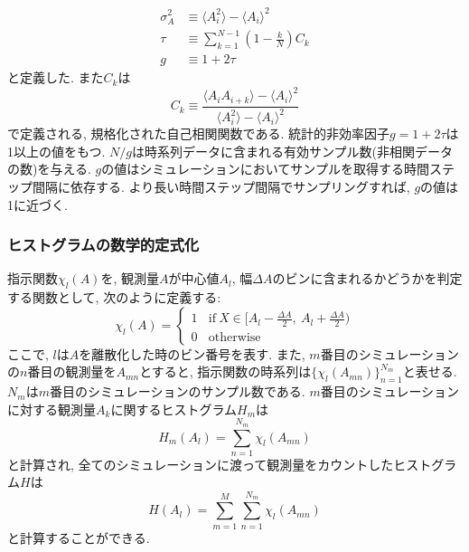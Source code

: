 \begin{align}
    \sigma_{A}^{2} &\equiv \langle A_{i}^{2} \rangle - \langle A_{i} \rangle^{2}
    \\
    \tau           &\equiv \sum_{k=1}^{N-1}\left(1 - \frac{k}{N}\right)C_{k}
    \\
    g              &\equiv 1 + 2\tau
\end{align}
と定義した. また$C_{k}$は
\begin{equation}
    C_{k} \equiv
    \frac{\langle A_{i} A_{i+k}\rangle - \langle A_{i} \rangle^{2}}{\langle A_{i}^{2} \rangle - \langle A_{i} \rangle^{2}}
\end{equation}
で定義される, 規格化された自己相関関数である. 
統計的非効率因子$g=1+2\tau$は1以上の値をもつ. $N/g$は時系列データに含まれる有効サンプル数(非相関データの数)を与える. 
$g$の値はシミュレーションにおいてサンプルを取得する時間ステップ間隔に依存する. 
より長い時間ステップ間隔でサンプリングすれば, $g$の値は1に近づく. 

\subsubsection{ヒストグラムの数学的定式化}
指示関数$\chi_{l}(A)$を, 観測量$A$が中心値$A_{l}$, 幅$\Delta A$のビンに含まれるかどうかを判定する関数として, 次のように定義する:
\begin{equation}
    \chi_{l}(A) =
    \begin{cases}
        1 ~~~~\text{if}~ X \in [A_{l} - \frac{\Delta A}{2},~ A_{l} + \frac{\Delta A}{2}) \\
        0 ~~~~\text{otherwise}
    \end{cases}
\end{equation}
ここで, $l$は$A$を離散化した時のビン番号を表す. また, 
$m$番目のシミュレーションの$n$番目の観測量を$A_{mn}$とすると, 指示関数の時系列は$\{\chi_{l}(A_{mn})\}_{n=1}^{N_m}$と表せる. 
$N_{m}$は$m$番目のシミュレーションのサンプル数である. 
$m$番目のシミュレーションに対する観測量$A_k$に関するヒストグラム$H_{m}$は
\begin{equation}
    H_{m}(A_{l}) = \sum_{n=1}^{N_m} \chi_{l}(A_{mn})
\end{equation}
と計算され, 全てのシミュレーションに渡って観測量をカウントしたヒストグラム$H$は
\begin{equation}
    H(A_{l}) = \sum_{m=1}^{M} \sum_{n=1}^{N_m} \chi_{l}(A_{mn})
\end{equation}
と計算することができる. 

